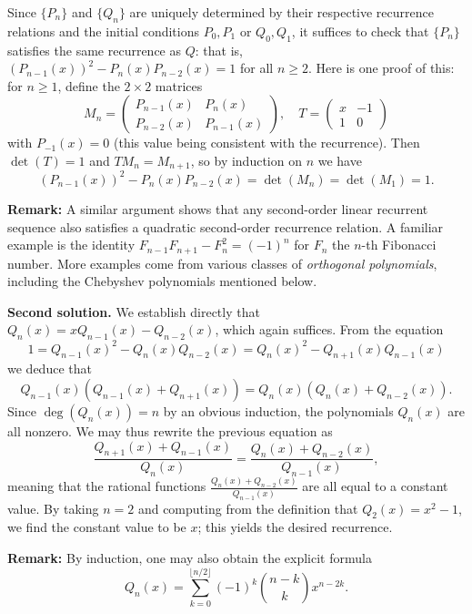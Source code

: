 \documentclass[amssymb,twocolumn,pra,10pt,aps]{revtex4-1}
\begin{document}
\begin{itemize}
 Since $\{P_n\}$ and $\{Q_n\}$ are 
uniquely determined by their respective recurrence relations and the 
initial conditions $P_0,P_1$ or $Q_0,Q_1$, it suffices to check that 
$\{P_n\}$ satisfies the same recurrence as $Q$: that is, 
$(P_{n-1}(x))^2-P_n(x)P_{n-2}(x) = 1$ for all $n \geq 2$. Here is one 
proof of this: for $n \geq 1$, define the $2\times 2$ matrices 
\[
M_n = 
\begin{pmatrix} P_{n-1}(x) & P_n (x) \\ P_{n-2}(x) & 
P_{n-1}(x) \end{pmatrix}, \quad T = \begin{pmatrix} x & -1 \\ 1 & 0 \end{pmatrix}
\]
with $P_{-1}(x) = 0$ (this value being consistent with the recurrence).
Then $\det(T) = 1$ and $T M_{n} = M_{n+1}$, so by induction on $n$ we have
\[
(P_{n-1}(x))^2-P_n(x)P_{n-2}(x) = \det(M_n) = 
\det(M_1) = 1.
\]

\noindent
\textbf{Remark:}
A similar argument shows that any second-order linear recurrent sequence also satisfies a quadratic second-order recurrence relation.
A familiar example is the identity $F_{n-1} F_{n+1} - F_n^2 = (-1)^{n}$ for $F_n$ the $n$-th Fibonacci number. 
More examples come from various classes of \emph{orthogonal polynomials}, including the Chebyshev polynomials mentioned below.

\noindent
\textbf{Second solution.}
We establish directly that $Q_n(x) = x 
Q_{n-1}(x)-Q_{n-2}(x)$, which again suffices. 
From the equation
\[
1 = Q_{n-1}(x)^2 - Q_n(x) Q_{n-2}(x) = Q_n(x)^2 - Q_{n+1}(x) Q_{n-1}(x)
\]
we deduce that
\[
Q_{n-1}(x)(Q_{n-1}(x) + Q_{n+1}(x)) = Q_n(x) (Q_n(x) + Q_{n-2}(x)).
\]
Since $\deg(Q_n(x)) = n$ by an obvious induction, the polynomials $Q_n(x)$ are all nonzero. We may thus rewrite the previous equation as
\[
\frac{Q_{n+1}(x) + Q_{n-1}(x)}{Q_n(x)} = \frac{Q_n(x) + Q_{n-2}(x)}{Q_{n-1}(x)},
\]
meaning that the rational functions $\frac{Q_n(x) + Q_{n-2}(x)}{Q_{n-1}(x)}$
are all equal to a constant value. By taking $n=2$ and computing from the definition that $Q_2(x) = x^2-1$,
we find the constant value to be $x$; this yields the desired recurrence.

\noindent
\textbf{Remark:}
By induction, one may also obtain the explicit formula
\[
Q_n(x) = \sum_{k=0}^{\lfloor n/2 \rfloor} (-1)^k \binom{n-k}{k} x^{n-2k}.
\]


\end{itemize}
\end{document}
